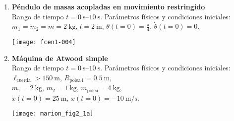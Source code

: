 \documentclass[11pt, spanish, a4paper, twoside]{article}
\begin{document}
\begin{enumerate}
\item 
\begin{minipage}[t][3cm]{0.7\textwidth}
\textbf{Péndulo de masas acopladas en movimiento restringido}\\ 
Rango de tiempo \(t = \SIrange{0}{10}{\second}\).
Parámetros físicos y condiciones iniciales:\\
\(m_1 = m_2 = m = \SI{2}{\kilo\gram}\), \(l = \SI{2}{\metre}\), \(\theta(t=0) = \frac{\pi}{4}\), \(\dot{\theta}(t=0) = 0\).
\end{minipage}
\begin{minipage}[c][1.5cm][t]{0.3\textwidth}
	\hspace{0.5cm}
   \texttt{[image: fcen1-004]}
\end{minipage}



%



\vspace{-0.9cm}
\item 
\begin{minipage}[t][3cm]{0.7\textwidth}
\textbf{Máquina de Atwood simple}\\
Rango de tiempo \(t = \SIrange{0}{10}{\second}\).
Parámetros físicos y condiciones iniciales:\\
\(\ell_\mathrm{cuerda} > \SI{150}{\metre}\), 
\(R_{\mathrm{polea}\,1} = \SI{0.5}{\metre}\), \\ 
\(m_1 = \SI{2}{\kilo\gram}\), 
\(m_2 = \SI{1}{\kilo\gram}\), 
\(m_\mathrm{polea} = \SI{4}{\kilo\gram}\), \\
\(x(t=0) = \SI{25}{\metre}\), 
\(\dot{x}(t=0) = -\SI{10}{\metre\per\second}\).
\end{minipage}
\begin{minipage}[c][3cm][t]{0.3\textwidth}
	\hspace{0.5cm}
	\texttt{[image: marion\_fig2\_1a]}
\end{minipage}




\end{enumerate}
\end{document}
